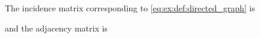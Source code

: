 \begin{example}\label{ex:def:directed_graph/matrices}
  The incidence matrix corresponding to \eqref{eq:ex:def:directed_graph} is
  \begin{balign*}
  \end{balign*}
  and the adjacency matrix is
  \begin{balign*}
  \end{balign*}
\end{example}

